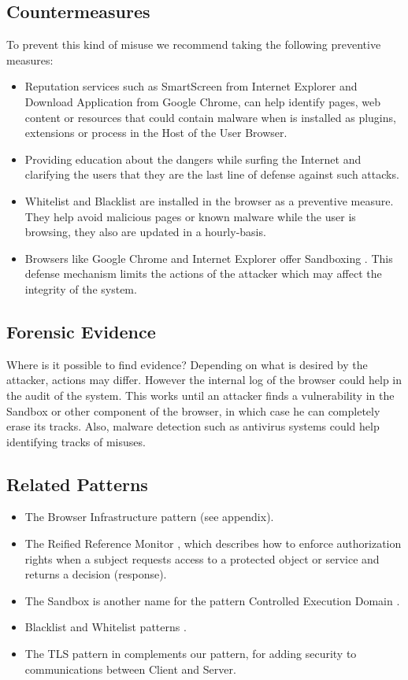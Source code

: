 \documentclass{sig-alternate-05-2015}
\begin{document}
\subsection*{Countermeasures} 
  To prevent this kind of misuse we recommend taking the following preventive measures:
  \begin{itemize}
    \item Reputation services such as SmartScreen \cite{Colvin2010} from Internet Explorer and Download Application \cite{Rajab2013} from Google Chrome, can help identify pages, web content or resources that could contain malware when is installed as plugins, extensions or process in the Host of the User Browser.
    \item Providing education about the dangers while surfing the Internet and clarifying the users that they are the last line of defense against such attacks.
    \item Whitelist and Blacklist are installed in the browser as a preventive measure. They help avoid malicious pages or known malware while the user is browsing, they also are updated in a hourly-basis.
    \item Browsers like Google Chrome and Internet Explorer offer Sandboxing \cite{sandboxGC,Yason}. This defense mechanism limits the actions of the attacker which may affect the integrity of the system.
  \end{itemize}

\subsection*{Forensic Evidence}
  Where is it possible to find evidence? Depending on what is desired by the attacker, actions may differ. However the internal log of the browser could help in the audit of the system. This works until an attacker finds a vulnerability in the Sandbox or other component of the browser, in which case he can completely erase its tracks. Also, malware detection such as antivirus systems could help identifying tracks of misuses.

\subsection*{Related Patterns}
  \begin{itemize}
    \item The Browser Infrastructure pattern \cite{silva2015} (see appendix).
    \item The Reified Reference Monitor \cite{fernandez2013security}, which describes how to enforce authorization rights when a subject requests access to a protected object or service and returns a decision (response). 
    \item The Sandbox is another name for the pattern Controlled Execution Domain \cite{fernandez2013security}.
    \item Blacklist and Whitelist patterns \cite{fernandez2013security}.
    \item The TLS pattern in \cite{fernandez2013security} complements our pattern, for adding security to communications between Client and Server.
  \end{itemize}
\end{document}
